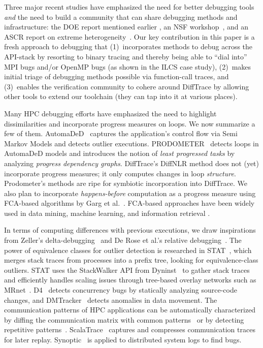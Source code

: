 Three major recent studies
have emphasized the need for better debugging tools
{\em and} the need to build a community that can share debugging
methods and infrastructure: the DOE report mentioned
earlier \cite{hpcdoe},
an NSF workshop~\cite{Cohen:2018:IRC:3297279}, and an ASCR report on
extreme heterogeneity~\cite{ascr-report-extreme-heterogeneity}.
%
Our key contribution in this paper is a fresh approach to debugging
that (1)~incorporates methods to debug across the API-stack
by resorting to binary tracing and thereby being able to ``dial into''
MPI bugs and/or OpenMP bugs (as shown in the ILCS case study), (2)~makes
initial triage of debugging methods possible via function-call traces,
and (3)~enables the verification community to cohere around DiffTrace
by allowing other tools to extend our toolchain (they can tap into it at various places).


Many HPC debugging efforts have emphasized
the need to highlight dissimilarities and
incorporate progress measures on loops. We now
summarize a few of them.
%
AutomaDeD~\cite{automaded-GBron}\cite{automaded-laguna}
captures the application's control flow
via Semi Markov Models and detects outlier executions.
%
PRODOMETER~\cite{prodometer} detects loops in
AutomaDeD models and introduces the
notion of {\em least progressed tasks} by analyzing {\em progress dependency graphs}.
%
DiffTrace's DiffNLR method does not (yet) incorporate progress measures; it only
computes changes in loop {\em structure}.
%
Prodometer's methods are ripe for symbiotic incorporation into DiffTrace.
%
We also plan to incorporate {\em happens-before} computation as a progress measure using FCA-based algorithms by Garg et al.~\cite{latticeForDistConst,garg_2015}.
%
FCA-based approaches have been widely used in data mining,
machine learning, and information retrieval \cite{ignatov17}.


In terms of computing differences with previous executions,
we draw inspirations from
Zeller's delta-debugging~\cite{DBLP:conf/esec/Zeller99}
and De Rose et al.'s relative debugging~\cite{relative-debugging}.
%
The power of equivalence classes for outlier detection is
researched in STAT~\cite{stat}, which
merges stack traces from processes into a prefix tree,
looking for equivalence-class outliers.
%
STAT uses the StackWalker API from Dyninst~\cite{dyninst} to gather stack traces
and efficiently handles scaling issues
through tree-based overlay networks such as MRnet~\cite{mrnet}.
%
D4~\cite{liu-18} detects concurrency bugs by statically analyzing source-code
changes, and DMTracker~\cite{dmtracker} detects anomalies in data movement.
%
The communication patterns of HPC applications can be automatically characterized by
diffing the communication matrix with common patterns~\cite{roth-15} or by
detecting repetitive patterns~\cite{preissl-08}.
%
ScalaTrace~\cite{scalatrace} captures and compresses communication traces for later replay.
%
Synoptic~\cite{beschastnikh-synoptic} is applied to distributed
system logs to find bugs.
%

